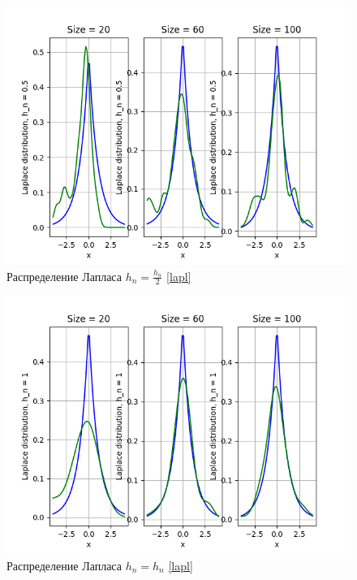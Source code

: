 \documentclass[a4paper]{article}
\begin{document}
        \begin{figure}[H]
            \centering
            \includegraphics[scale = 0.4]{Laplace distribution, h_n = 0.5.png}
            \caption{Распределение Лапласа $h_n = \frac{h_n}{2}$ \eqref{lapl}}
            \label{fig:cauchy}
        \end{figure}
        
        \begin{figure}[H]
            \centering
            \includegraphics[scale = 0.4]{Laplace distribution, h_n = 1.png}
            \caption{Распределение Лапласа $h_n = h_n$ \eqref{lapl}}
            \label{fig:cauchy}
        \end{figure}
        
\end{document}
